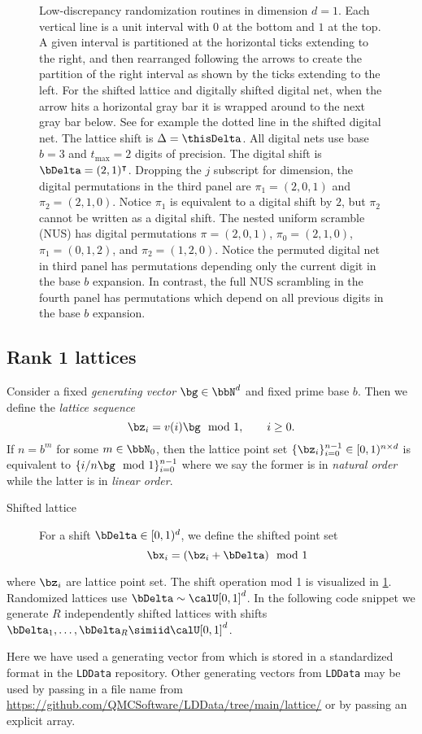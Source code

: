 \documentclass[acmsmall]{acmart}
\begin{document}
\begin{figure}
    \caption{Low-discrepancy randomization routines in dimension $d=1$. Each vertical line is a unit interval with $0$ at the bottom and $1$ at the top. A given interval is partitioned at the horizontal ticks extending to the right, and then rearranged following the arrows to create the partition of the right interval as shown by the ticks extending to the left. For the shifted lattice and digitally shifted digital net, when the arrow hits a horizontal gray bar it is wrapped around to the next gray bar below. See for example the dotted line in the shifted digital net. The lattice shift is $\Delta = \thisDelta$. All digital nets use base $b=3$ and $t_\mathrm{max}=2$ digits of precision. The digital shift is $\bDelta = (2,1)^\intercal$. Dropping the $j$ subscript for dimension, the digital permutations in the third panel are $\pi_1 = (2,0,1)$ and $\pi_2 = (2,1,0)$. Notice $\pi_1$ is equivalent to a digital shift by $2$, but $\pi_2$ cannot be written as a digital shift. The nested uniform scramble (NUS) has digital permutations $\pi = (2,0,1)$, $\pi_0 = (2,1,0)$, $\pi_1 = (0,1,2)$, and $\pi_2 = (1,2,0)$. Notice the permuted digital net in third panel has permutations depending only the current digit in the base $b$ expansion. In contrast, the full NUS scrambling in the fourth panel has permutations which depend on all previous digits in the base $b$ expansion.}
    \label{fig:ld_randomizations}
\end{figure}  

\subsection{Rank 1 lattices}

Consider a fixed \emph{generating vector} $\bg \in \bbN^d$ and fixed prime base $b$. Then we define the \emph{lattice sequence} 
$$\bz_i = v(i) \bg \mod 1, \qquad i \geq 0.$$
If $n=b^m$ for some $m \in \bbN_0$, then the lattice point set $\{\bz_i\}_{i=0}^{n-1}\in [0,1)^{n \times d}$ is equivalent to $\{i/n \bg \mod 1\}_{i=0}^{n-1}$ where we say the former is in \emph{natural order} while the latter is in \emph{linear order}. 

\begin{description}
    \item[Shifted lattice] For a shift $\bDelta \in [0,1)^d$, we define the shifted point set 
    $$\bx_i= (\bz_i + \bDelta) \mod 1$$ 
\end{description}
where $\bz_i$ are lattice point set. The shift operation mod 1 is visualized in \cref{fig:ld_randomizations}. Randomized lattices use $\bDelta \sim \calU[0,1]^d$. In the following code snippet we generate $R$ independently shifted lattices with shifts $\bDelta_1,\dots,\bDelta_R \simiid \calU[0,1]^d$. 

Here we have used a generating vector from \citep{cools2006constructing} which is stored in a standardized format in the \texttt{LDData} repository. Other generating vectors from \texttt{LDData} may be used by passing in a file name from \url{https://github.com/QMCSoftware/LDData/tree/main/lattice/} or by passing an explicit array. 
\end{document}
